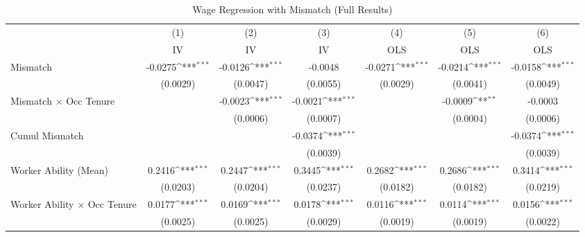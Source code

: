 {
\def\sym#1{\ifmmode^{#1}\else\(^{#1}\)\fi}
\begin{longtable}{l*{6}{c}}
\caption{Wage Regression with Mismatch (Full Results)}\\
\hline  \endfirsthead\hline  \endhead\hline  \endfoot\endlastfoot
                    &\multicolumn{1}{c}{(1)}&\multicolumn{1}{c}{(2)}&\multicolumn{1}{c}{(3)}&\multicolumn{1}{c}{(4)}&\multicolumn{1}{c}{(5)}&\multicolumn{1}{c}{(6)}\\
                    &\multicolumn{1}{c}{IV}&\multicolumn{1}{c}{IV}&\multicolumn{1}{c}{IV}&\multicolumn{1}{c}{OLS}&\multicolumn{1}{c}{OLS}&\multicolumn{1}{c}{OLS}\\
\hline  
Mismatch            &     -0.0275\sym{***}&     -0.0126\sym{***}&     -0.0048         &     -0.0271\sym{***}&     -0.0214\sym{***}&     -0.0158\sym{***}\\
                    &    (0.0029)         &    (0.0047)         &    (0.0055)         &    (0.0029)         &    (0.0041)         &    (0.0049)         \\
Mismatch $\times$ Occ Tenure&                     &     -0.0023\sym{***}&     -0.0021\sym{***}&                     &     -0.0009\sym{**} &     -0.0003         \\
                    &                     &    (0.0006)         &    (0.0007)         &                     &    (0.0004)         &    (0.0006)         \\
Cumul Mismatch      &                     &                     &     -0.0374\sym{***}&                     &                     &     -0.0374\sym{***}\\
                    &                     &                     &    (0.0039)         &                     &                     &    (0.0039)         \\
Worker Ability (Mean)&      0.2416\sym{***}&      0.2447\sym{***}&      0.3445\sym{***}&      0.2682\sym{***}&      0.2686\sym{***}&      0.3414\sym{***}\\
                    &    (0.0203)         &    (0.0204)         &    (0.0237)         &    (0.0182)         &    (0.0182)         &    (0.0219)         \\
Worker Ability $\times$ Occ Tenure&      0.0177\sym{***}&      0.0169\sym{***}&      0.0178\sym{***}&      0.0116\sym{***}&      0.0114\sym{***}&      0.0156\sym{***}\\
                    &    (0.0025)         &    (0.0025)         &    (0.0029)         &    (0.0019)         &    (0.0019)         &    (0.0022)         \\

\end{longtable}}
